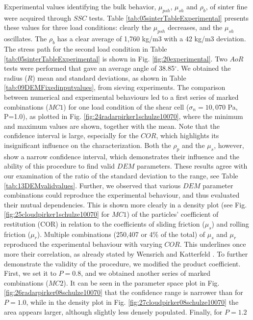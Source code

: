 \documentclass{llncs}
\begin{document}
Experimental values identifying the bulk behavior, $\mu_{psh}$, $\mu_{sh}$ and $\rho_{b}$, 
of sinter fine were acquired through $SSC$ tests. 
Table \ref{tab:05sinterTableExperimental} presents
these values for three load conditions: clearly the $\mu_{psh}$ decreases, and 
the $\mu_{sh}$ oscillates.
The $\rho_b$ has a clear average of 1,760 kg/m3 with a 42 
kg/m3 deviation.
The stress path for the second load condition in Table
\ref{tab:05sinterTableExperimental} is shown in Fig.
\ref{fig:20experimental}.
Two $AoR$ tests were performed that gave an average angle of
38.85$^\circ$.
We obtained the radius ($R$) mean and standard
deviations, as shown in Table
\ref{tab:09DEMFixedinputvalues}, from sieving experiments.
The comparison between numerical and experimental behaviours led to a first
series of marked combinations ($MC1$) for one load condition of
the shear cell ($\sigma_n=10,070$ Pa, P=1.0), as plotted in Fig.
\ref{fig:24radarpirker1schulze10070}, where 
the minimum and maximum values are shown, together with the mean. 
Note that the confidence interval is large, 
especially for the $COR$, which highlights its insignificant influence on the
characterization.
Both the $\rho_p$  and the $\mu_s$, however, show a narrow confidence interval, 
which demonstrates their influence and the ability of this procedure to find
valid $DEM$ parameters.
These results agree with our examination of the ratio of the standard deviation
to the range, see Table \ref{tab:13DEMvalidvalues}.
Further, we observed that various $DEM$ parameter
combinations could reproduce the experimental behaviour, and thus evaluated
their mutual dependencies.
This is shown more clearly in a density plot (see Fig. 
\ref{fig:25cloudpirker1schulze10070} for $MC1$) 
of the particles' coefficient of restitution (COR) in relation to
the coefficients of sliding friction ($\mu_s$) and rolling friction ($\mu_r$). 
Multiple
combinations (250,407 or 4\% of the total) of $\mu_s$ and $\mu_r$ reproduced
the experimental behaviour with varying $COR$.
This underlines once more their correlation, as already stated by Wensrich and 
Katterfeld \cite{RefWorks:87}.
To further demonstrate the validity of the procedure, we modified the product
coefficient. 
First, we set it to $P=0.8$, and we obtained another
series of marked combinations ($MC2$).
It can be seen in the parameter space plot in Fig.
\ref{fig:26radarpirker08schulze10070} that the confidence range is narrower
than for $P=1.0$, while in the density plot in Fig. 
\ref{fig:27cloudpirker08schulze10070} the area
appears larger, although slightly less densely populated. Finally, for $P=1.2$
\end{document}
